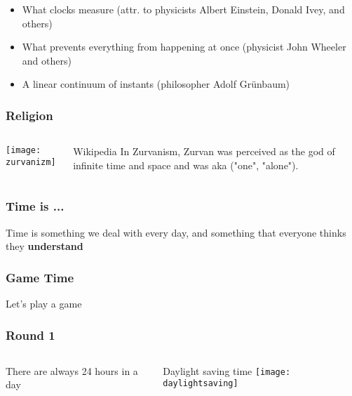 \documentclass[aspectratio=169, 15pt,usenames,dvipsnames]{beamer}
\begin{document}
{\begin{gdblank}
		\large
		\vskip1cm
		\begin{itemize}
			\item What clocks measure (attr. to physicists Albert Einstein, Donald Ivey, and others)
			      \pause
			\item What prevents everything from happening at once (physicist John Wheeler and others)
			\item A linear continuum of instants (philosopher Adolf Grünbaum)
		\end{itemize}
	\end{gdblank}
	\begin{gdblank}
		\frametitle{Religion}
		\begin{columns}
			\begin{column}{0.5\textwidth}
				\centering\texttt{[image: zurvanizm]} 
			\end{column}
			\begin{column}{0.5\textwidth}
				\begin{block}{Wikipedia}
					In Zurvanism, Zurvan was perceived as the god of infinite time and space and was aka ("one", "alone").
				\end{block} 
			\end{column}
		\end{columns}     
	\end{gdblank}
	\begin{gdblank}
		\frametitle{Time is ...}
		\LARGE\centering Time is something we deal with every day, and something that everyone thinks they 
		\bf understand
	\end{gdblank} 
	\begin{gdblank}
		\frametitle{Game Time}
		\Huge\centering Let's play a game
	\end{gdblank} 
	\begin{gdblank}
		\frametitle{Round 1}    
		\begin{columns}
			\begin{column}{0.70\textwidth}
				\centering
				\LARGE There are always 24 hours in a day 
				\pause     
			\end{column}
			\begin{column}{0.3\textwidth}
				\large\centering Daylight saving time 
				\vskip0.5cm
				\texttt{[image: daylightsaving]}
			\end{column}
		\end{columns}
	\end{gdblank} 
	
}
\end{document}
